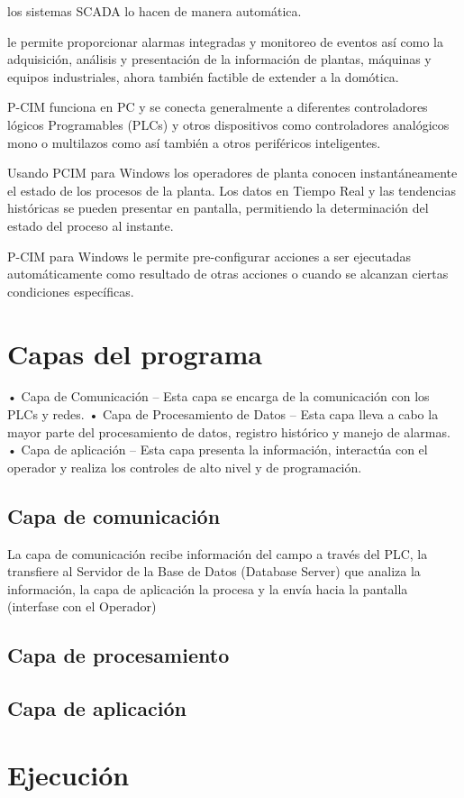 los sistemas SCADA lo hacen de manera automática.

 le permite proporcionar alarmas integradas y monitoreo de eventos así como la 
 adquisición, análisis y presentación de la información de plantas, máquinas y 
 equipos industriales, ahora también factible de extender a la domótica.

P-CIM funciona en PC y se conecta generalmente a diferentes controladores 
lógicos Programables (PLCs) y otros dispositivos como controladores analógicos 
mono o multilazos como así también a otros periféricos inteligentes. 


Usando PCIM para Windows los operadores de planta conocen instantáneamente 
el estado de los procesos de la planta. Los datos en Tiempo Real y las 
tendencias históricas se pueden presentar en pantalla, permitiendo la 
determinación del estado del proceso al instante.

P-CIM para Windows le permite pre-configurar acciones a ser ejecutadas 
automáticamente como resultado de otras acciones o cuando se alcanzan 
ciertas condiciones específicas.

\section{Capas del programa}
\label{sec:CapasPrograma}
• Capa de Comunicación – Esta capa se encarga de la comunicación con los PLCs y redes.
• Capa de Procesamiento de Datos – Esta capa lleva a cabo la mayor parte del procesamiento de datos, registro histórico y manejo de alarmas.
• Capa de aplicación – Esta capa presenta la información, interactúa con el operador y realiza los controles de alto nivel y de programación.

\subsection{Capa de comunicación}
\label{subsec:CapaComunicacion}

La capa de comunicación recibe información del campo a través del 
PLC, la transfiere al Servidor de la Base de Datos (Database Server) 
que analiza la información, la capa de aplicación la procesa y la 
envía hacia la pantalla (interfase con el Operador)

\subsection{Capa de procesamiento}
\label{subsec:CapaProcesamiento}


\subsection{Capa de aplicación}
\label{subsec:CapaAplicacion}


\section{Ejecución}
\label{sec:Ejecucion}
